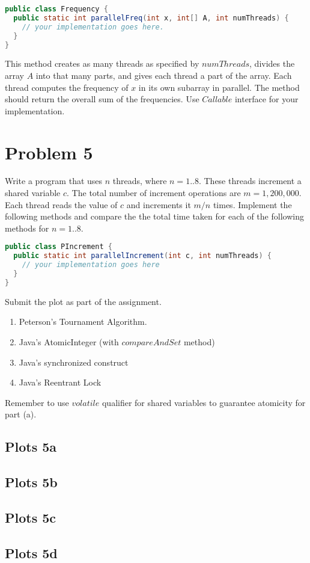 \documentclass{article}
\begin{document}
\begin{lstlisting}[language=Java]
public class Frequency {
  public static int parallelFreq(int x, int[] A, int numThreads) {
    // your implementation goes here.
  }
}
\end{lstlisting}

This method creates as many threads as specified by $numThreads$, divides the array $A$ into that many parts, and gives each thread a part of the array. Each thread computes the frequency of $x$ in its own subarray in parallel. The method should return the overall sum of the frequencies. Use $Callable$ interface for your implementation.

\pagebreak
\section{Problem 5}
Write a program that uses $n$ threads, where $n = 1..8$. These threads increment a shared variable $c$. The total number of increment operations are $m = 1, 200, 000$. Each thread reads the value of $c$ and increments it $m/n$ times. Implement the following methods and compare the the total time taken for each of
the following methods for $n = 1..8$.

\begin{lstlisting}[language=Java]
public class PIncrement {
  public static int parallelIncrement(int c, int numThreads) {
    // your implementation goes here
  }
}
\end{lstlisting}


Submit the plot as part of the assignment.

\begin{enumerate}[label=\alph*)]
  \item Peterson’s Tournament Algorithm.
  \item Java’s AtomicInteger (with $compareAndSet$ method)
  \item Java’s synchronized construct
  \item Java’s Reentrant Lock
\end{enumerate}

Remember to use $volatile$ qualifier for shared variables to guarantee
atomicity for part (a).

\subsection{Plots 5a}

\subsection{Plots 5b}

\subsection{Plots 5c}

\subsection{Plots 5d}
\end{document}
